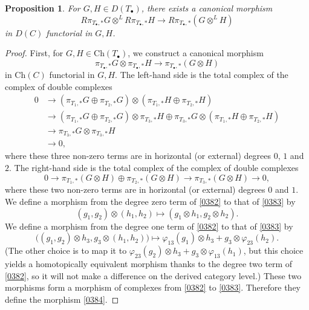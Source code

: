 \documentclass{amsart}
\newtheorem{Prop}[Thm]{Proposition}
\theoremstyle{remark}
\numberwithin{equation}{subsection}
\newcommand{\tensor}{\mathbin{\otimes}}
\newcommand{\Ch}{\mathrm{Ch}}
\begin{document}
\begin{Prop} \label{0385}
	For $G, H \in D(T_{\bullet})$,
	there exists a canonical morphism
		\[
				R \pi_{T_{\bullet}, \ast} G \tensor^{L} R \pi_{T_{\bullet}, \ast} H
			\to
				R \pi_{T_{\bullet}, \ast}(G \tensor^{L} H)
		\]
	in $D(C)$ functorial in $G, H$.
\end{Prop}

\begin{proof}
	First, for $G, H \in \Ch(T_{\bullet})$, we construct a canonical morphism
		\begin{equation} \label{0384}
				\pi_{T_{\bullet}, \ast} G \tensor \pi_{T_{\bullet}, \ast} H
			\to
				\pi_{T_{\bullet}, \ast}(G \tensor H)
		\end{equation}
	in $\Ch(C)$ functorial in $G, H$.
	The left-hand side is the total complex of the complex of double complexes
		\begin{equation} \label{0382}
			\begin{aligned}
							0
				&	\to
							(\pi_{T_{1}, \ast} G \oplus \pi_{T_{2}, \ast} G)
						\tensor
							(\pi_{T_{1}, \ast} H \oplus \pi_{T_{2}, \ast} H)
				\\
				&	\to
							(\pi_{T_{1}, \ast} G \oplus \pi_{T_{2}, \ast} G) \tensor \pi_{T_{3}, \ast} H
						\oplus
							\pi_{T_{3}, \ast} G \tensor (\pi_{T_{1}, \ast} H \oplus \pi_{T_{2}, \ast} H)
				\\
				&	\to
						\pi_{T_{3}, \ast} G \tensor \pi_{T_{3}, \ast} H
				\\
				&	\to
						0,
			\end{aligned}
		\end{equation}
	where these three non-zero terms are in horizontal (or external) degrees $0$, $1$ and $2$.
	The right-hand side is the total complex of the complex of double complexes
		\begin{equation} \label{0383}
				0
			\to
				\pi_{T_{1}, \ast}(G \tensor H) \oplus \pi_{T_{2}, \ast}(G \tensor H)
			\to
				\pi_{T_{3}, \ast}(G \tensor H)
			\to
				0,
		\end{equation}
	where these two non-zero terms are in horizontal (or external) degrees $0$ and $1$.
	We define a morphism from the degree zero term of \eqref{0382} to that of \eqref{0383} by
		\[
				(g_{1}, g_{2}) \tensor (h_{1}, h_{2})
			\mapsto
				(g_{1} \tensor h_{1}, g_{2} \tensor h_{2}).
		\]
	We define a morphism from the degree one term of \eqref{0382} to that of \eqref{0383} by
		\[
				\bigl(
					(g_{1}, g_{2}) \tensor h_{3},
					g_{3} \tensor (h_{1}, h_{2})
				\bigr)
			\mapsto
				\varphi_{1 3}(g_{1}) \tensor h_{3} + g_{3} \tensor \varphi_{2 3}(h_{2}).
		\]
	(The other choice is to map it to
		$
			\varphi_{2 3}(g_{2}) \tensor h_{3} + g_{3} \tensor \varphi_{1 3}(h_{1})
		$,
	but this choice yields a homotopically equivalent morphism
	thanks to the degree two term of \eqref{0382},
	so it will not make a difference on the derived category level.)
	These two morphisms form a morphism of complexes from \eqref{0382} to \eqref{0383}.
	Therefore they define the morphism \eqref{0384}.
	

\end{proof}
\end{document}
